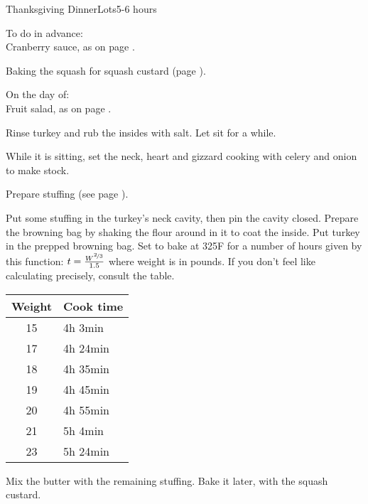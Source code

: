 \documentclass[../Cookbook.tex]{subfiles}
\begin{document}
\begin{recipe}{Thanksgiving Dinner}{Lots}{5-6 hours}

To do in advance: \\
Cranberry sauce, as on page \pageref{CranberrySauce}.

Baking the squash for squash custard (page \pageref{SquashCustard}).

\newstep
On the day of: \\
Fruit salad, as on page \pageref{FruitSalad}.

Rinse turkey and rub the insides with salt. Let sit for a while.

While it is sitting, set the neck, heart and gizzard cooking with celery and onion to make stock.

Prepare stuffing (see page \pageref{Stuffing}).

\begin{minipage}{.7\textwidth}
	Put some stuffing in the turkey's neck cavity, then pin the cavity closed.
	Prepare the browning bag by shaking the flour around in it to coat the inside.
	Put turkey in the prepped browning bag.
	Set to bake at 325\0F for a number of hours given by this function:
	$ t = \frac{W^{\nicefrac{2}{3}}}{1.5} $
	where weight is in pounds.
	If you don't feel like calculating precisely, consult the table.
\end{minipage}
\begin{minipage}{.29\textwidth}
	\begin{tabular}{c|l}
		Weight & Cook time \\ \hline
		15 & 4h 3min \\
		17 & 4h 24min \\
		18 & 4h 35min \\
		19 & 4h 45min \\
		20 & 4h 55min \\
		21 & 5h 4min \\
		23 & 5h 24min
	\end{tabular}
\end{minipage}

Mix the butter with the remaining stuffing. Bake it later, with the squash custard.


\end{recipe}
\end{document}
